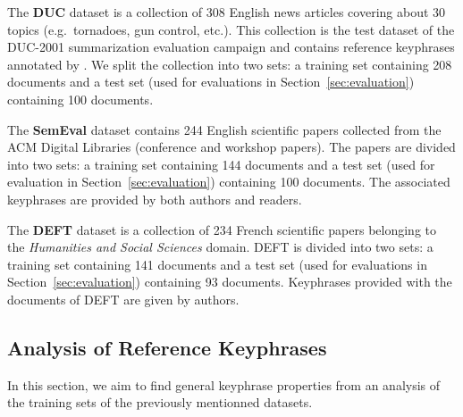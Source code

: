     The \textbf{DUC} dataset \cite{over2001duc} is a collection of 308 English
    news articles covering about 30 topics (e.g.~tornadoes, gun control, etc.).
    This collection is the test dataset of the DUC-2001 summarization evaluation
    campaign and contains reference keyphrases annotated by
    . We split the collection into two sets: a
    training set containing 208 documents and a test set (used for evaluations
    in Section~\ref{sec:evaluation}) containing 100 documents.

    The \textbf{SemEval} dataset \cite{kim2010semeval} contains 244 English
    scientific papers collected from the ACM Digital Libraries (conference and
    workshop papers). The papers are divided into two sets: a training set
    containing 144 documents and a test set (used for evaluation in
    Section~\ref{sec:evaluation}) containing 100 documents. The associated
    keyphrases are provided by both authors and readers.

    The \textbf{DEFT} dataset \cite{Paroubek2012deft} is a collection of 234
    French scientific papers belonging to the \textit{Humanities and Social
    Sciences} domain. DEFT is divided into two sets: a training set containing
    141 documents and a test set (used for evaluations in
    Section~\ref{sec:evaluation}) containing 93 documents. Keyphrases provided
    with the documents of DEFT are given by authors.

  \subsection{Analysis of Reference Keyphrases}
  \label{subsec:keyphrase_analysis}
    In this section, we aim to find general keyphrase properties from an
    analysis of the training sets of the previously mentionned datasets.

